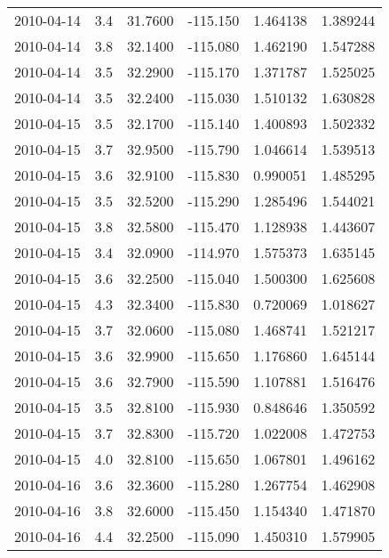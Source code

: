 \begin{tabular}{lrrrrr}
2010-04-14 &       3.4 &  31.7600 &  -115.150 &         1.464138 &         1.389244 \\
2010-04-14 &       3.8 &  32.1400 &  -115.080 &         1.462190 &         1.547288 \\
2010-04-14 &       3.5 &  32.2900 &  -115.170 &         1.371787 &         1.525025 \\
2010-04-14 &       3.5 &  32.2400 &  -115.030 &         1.510132 &         1.630828 \\
2010-04-15 &       3.5 &  32.1700 &  -115.140 &         1.400893 &         1.502332 \\
2010-04-15 &       3.7 &  32.9500 &  -115.790 &         1.046614 &         1.539513 \\
2010-04-15 &       3.6 &  32.9100 &  -115.830 &         0.990051 &         1.485295 \\
2010-04-15 &       3.5 &  32.5200 &  -115.290 &         1.285496 &         1.544021 \\
2010-04-15 &       3.8 &  32.5800 &  -115.470 &         1.128938 &         1.443607 \\
2010-04-15 &       3.4 &  32.0900 &  -114.970 &         1.575373 &         1.635145 \\
2010-04-15 &       3.6 &  32.2500 &  -115.040 &         1.500300 &         1.625608 \\
2010-04-15 &       4.3 &  32.3400 &  -115.830 &         0.720069 &         1.018627 \\
2010-04-15 &       3.7 &  32.0600 &  -115.080 &         1.468741 &         1.521217 \\
2010-04-15 &       3.6 &  32.9900 &  -115.650 &         1.176860 &         1.645144 \\
2010-04-15 &       3.6 &  32.7900 &  -115.590 &         1.107881 &         1.516476 \\
2010-04-15 &       3.5 &  32.8100 &  -115.930 &         0.848646 &         1.350592 \\
2010-04-15 &       3.7 &  32.8300 &  -115.720 &         1.022008 &         1.472753 \\
2010-04-15 &       4.0 &  32.8100 &  -115.650 &         1.067801 &         1.496162 \\
2010-04-16 &       3.6 &  32.3600 &  -115.280 &         1.267754 &         1.462908 \\
2010-04-16 &       3.8 &  32.6000 &  -115.450 &         1.154340 &         1.471870 \\
2010-04-16 &       4.4 &  32.2500 &  -115.090 &         1.450310 &         1.579905 \\

\end{tabular}

